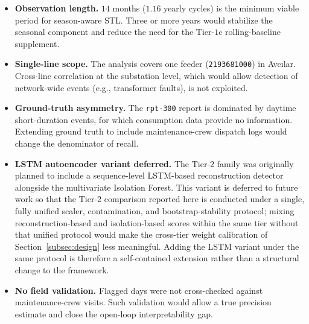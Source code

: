 \documentclass{article}
\begin{document}
\begin{itemize}[leftmargin=1.5em,itemsep=2pt]
  \item \textbf{Observation length.} $14$ months ($1.16$ yearly cycles) is the minimum viable period for season-aware STL. Three or more years would stabilize the seasonal component and reduce the need for the Tier-$1$c rolling-baseline supplement.

  \item \textbf{Single-line scope.} The analysis covers one feeder (\texttt{2193681000}) in Avc{\i}lar. Cross-line correlation at the substation level, which would allow detection of network-wide events (e.g., transformer faults), is not exploited.

  \item \textbf{Ground-truth asymmetry.} The \texttt{rpt-300} report is dominated by daytime short-duration events, for which consumption data provide no information. Extending ground truth to include maintenance-crew dispatch logs would change the denominator of recall.

  \item \textbf{LSTM autoencoder variant deferred.} The Tier-$2$ family was originally planned to include a sequence-level LSTM-based reconstruction detector~\cite{malhotra2016lstm} alongside the multivariate Isolation Forest. This variant is deferred to future work so that the Tier-$2$ comparison reported here is conducted under a single, fully unified scaler, contamination, and bootstrap-stability protocol; mixing reconstruction-based and isolation-based scores within the same tier without that unified protocol would make the cross-tier weight calibration of Section~\ref{subsec:design} less meaningful. Adding the LSTM variant under the same protocol is therefore a self-contained extension rather than a structural change to the framework.


  \item \textbf{No field validation.} Flagged days were not cross-checked against maintenance-crew visits. Such validation would allow a true precision estimate and close the open-loop interpretability gap.
\end{itemize}



\end{document}
